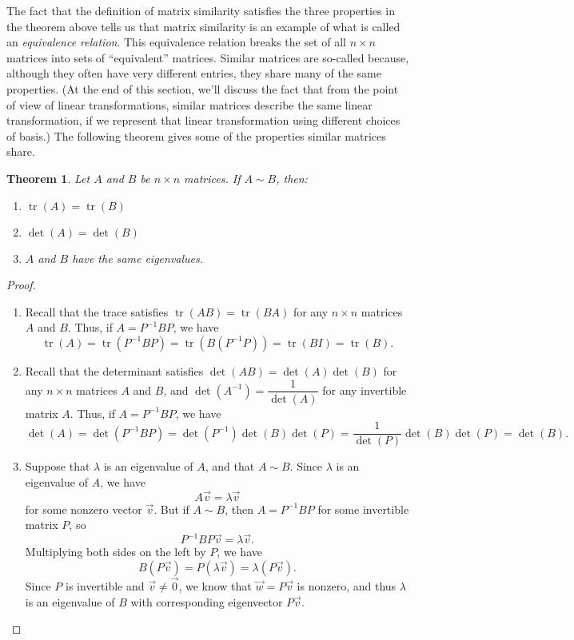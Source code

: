 \documentclass[12pt,letterpaper]{article}
\newtheorem{theorem}{Theorem}
\DeclareMathOperator{\tr}{tr}
\begin{document}
The fact that the definition of matrix similarity satisfies the three properties in the theorem above tells us that matrix similarity is an example of what is called an \textit{equivalence relation}. This equivalence relation breaks the set of all $n\times n$ matrices into sets of ``equivalent'' matrices.  Similar matrices are so-called because, although they often have very different entries, they share many of the same properties. (At the end of this section, we'll discuss the fact that from the point of view of linear transformations, similar matrices describe the same linear transformation, if we represent that linear transformation using different choices of basis.) The following theorem gives some of the properties similar matrices share.


\begin{theorem}
 Let $A$ and $B$ be $n\times n$ matrices. If $A\sim B$, then:
\begin{enumerate}
 \item $\tr(A) = \tr(B)$
 \item $\det(A) = \det(B)$
 \item $A$ and $B$ have the same eigenvalues.
\end{enumerate}
\end{theorem}
\begin{proof}
 \begin{enumerate}
  \item Recall that the trace satisfies $\tr(AB) = \tr(BA)$ for any $n\times n$ matrices $A$ and $B$. Thus, if $A = P^{-1}BP$, we have
\[
 \tr(A) = \tr(P^{-1}BP) = \tr(B(P^{-1}P)) = \tr(BI)=\tr(B).
\]
 \item Recall that the determinant satisfies $\det(AB) = \det(A)\det(B)$ for any $n\times n$ matrices $A$ and $B$, and $\det(A^{-1}) = \dfrac{1}{\det(A)}$ for any invertible matrix $A$. Thus, if $A = P^{-1}BP$, we have
\[
 \det(A) = \det(P^{-1}BP) = \det(P^{-1})\det(B)\det(P) = \frac{1}{\det(P)}\det(B)\det(P) = \det(B).
\]
 \item Suppose that $\lambda$ is an eigenvalue of $A$, and that $A\sim B$. Since $\lambda$ is an eigenvalue of $A$, we have
\[
 A\vec{v} = \lambda\vec{v}
\]
for some nonzero vector $\vec{v}$. But if $A\sim B$, then $A = P^{-1}BP$ for some invertible matrix $P$, so 
\[
 P^{-1}BP\vec{v} = \lambda\vec{v}.
\]
Multiplying both sides on the left by $P$, we have
\[
 B(P\vec{v}) = P(\lambda\vec{v}) = \lambda(P\vec{v}).
\]
Since $P$ is invertible and $\vec{v}\neq \vec{0}$, we know that $\vec{w} = P\vec{v}$ is nonzero, and thus $\lambda$ is an eigenvalue of $B$ with corresponding eigenvector $P\vec{v}$.
 \end{enumerate}

\end{proof}
\end{document}
